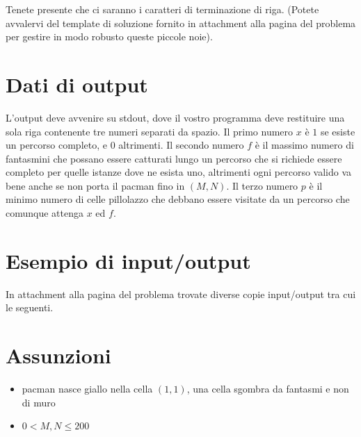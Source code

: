 Tenete presente che ci saranno i caratteri di terminazione di riga. (Potete avvalervi del template di soluzione fornito in attachment alla pagina del problema per gestire in modo robusto queste piccole noie). 

\section*{Dati di output}

L'output deve avvenire su stdout, dove il vostro programma deve restituire una sola riga contenente tre numeri separati da spazio.
Il primo numero $x$ è $1$ se esiste un percorso completo, e $0$ altrimenti.
Il secondo numero $f$ è il massimo numero di fantasmini che possano essere catturati lungo un percorso che si richiede essere completo per quelle istanze dove ne esista uno, altrimenti ogni percorso valido va bene anche se non porta il pacman fino in $(M,N)$.
Il terzo numero $p$ è il minimo numero di celle pillolazzo che debbano essere visitate da un percorso che comunque attenga $x$ ed $f$.


\section*{Esempio di input/output}

In attachment alla pagina del problema trovate diverse copie input/output tra cui le seguenti.

\vspace{0.5cm}



\section*{Assunzioni}
\begin{itemize}
\item pacman nasce giallo nella cella $(1, 1)$, una cella sgombra da fantasmi e non di muro
\item $0 < M,N \le 200$
\end{itemize}

